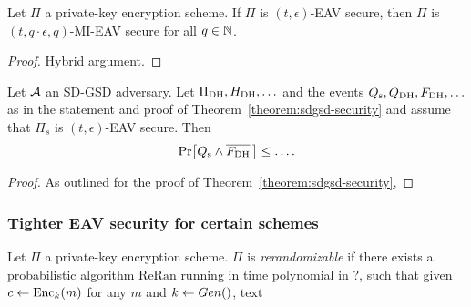 \begin{lemma}
	Let $\Pi$ a private-key encryption scheme. If $\Pi$ is $(t, \epsilon)$-EAV secure, then $\Pi$ is $(t, q \cdot \epsilon, q)$-MI-EAV secure for all $q \in \mathbb{N}$.
\end{lemma}
\begin{proof}
	Hybrid argument.
\end{proof}

\begin{lemma} \label{lemma:eav-reduction}
	Let $\mathcal{A}$ an SD-GSD adversary. Let $\Pi_{\mathrm{DH}}, H_\mathrm{DH}, \ldots$ and the events $Q_\mathrm{s}, Q_\mathrm{DH}, F_\mathrm{DH}, \ldots$ as in the statement and proof of Theorem~\vref{theorem:sdgsd-security} and assume that $\Pi_s$ is $(t, \epsilon)$-EAV secure. Then
	$$
		\pr{\qs \land \overline{\fdh}\,} \le \ldots.
	$$
\end{lemma}
\begin{proof}
	As outlined for the proof of Theorem~\vref{theorem:sdgsd-security},

\end{proof}

\subsubsection{Tighter EAV security for certain schemes}

\begin{definition}[Rerandomizability]
	Let $\Pi$ a private-key encryption scheme. $\Pi$ is \emph{rerandomizable} if there exists a probabilistic algorithm $\mathrm{ReRan}$ running in time polynomial in ?, such that given $c \leftarrow \mathrm{Enc}_k(m)$ for any $m$ and $k \leftarrow Gen()$, $\mathrm{text}$
\end{definition}

\begin{lemma}

\end{lemma}
